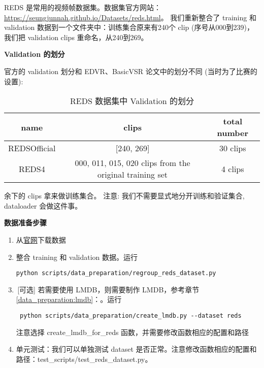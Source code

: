 \documentclass[../main.tex]{subfiles}
\begin{document}
REDS 是常用的视频帧数据集。数据集官方网站：\url{https://seungjunnah.github.io/Datasets/reds.html}。
我们重新整合了 training 和 validation 数据到一个文件夹中：训练集合原来有240个 clip (序号从000到239)，我们把 validation clips 重命名，从240到269。

\noindent\textbf{Validation 的划分}

官方的 validation 划分和 EDVR、BasicVSR 论文中的划分不同 (当时为了比赛的设置):

\begin{table}[h]
    \centering
    \begin{tabular}{|c|c|c|}
        \hline
        \textbf{name} & \textbf{clips}                                          & \textbf{total number} \\ \hline
        REDSOfficial  & [240, 269]                                              & 30 clips              \\ \hline
        REDS4         & 000, 011, 015, 020 clips from the original training set & 4 clips               \\ \hline
    \end{tabular}
    \caption{REDS 数据集中 Validation 的划分}
\end{table}
余下的 clips 拿来做训练集合。 注意: 我们不需要显式地分开训练和验证集合, dataloader 会做这件事。

\noindent\textbf{数据准备步骤}

\begin{enumerate}
    \item 从\href{https://seungjunnah.github.io/Datasets/reds.html}{官网}下载数据
    \item 整合 training 和 validation 数据。运行
    \begin{verbatim}
python scripts/data_preparation/regroup_reds_dataset.py
\end{verbatim}
    \item\,[可选] 若需要使用 LMDB，则需要制作 LMDB，参考章节 \ref{data_preparation:lmdb}：。运行
    \begin{verbatim}
 python scripts/data_preparation/create_lmdb.py --dataset reds
\end{verbatim}
    注意选择 create\_lmdb\_for\_reds 函数，并需要修改函数相应的配置和路径
    \item 单元测试：我们可以单独测试 dataset 是否正常。注意修改函数相应的配置和路径：test\_scripts/test\_reds\_dataset.py。
\end{enumerate}
\end{document}
